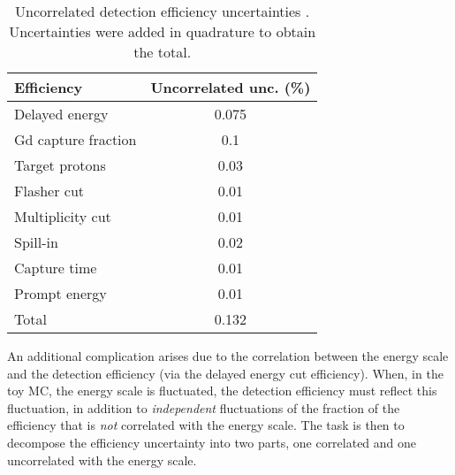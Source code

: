 \documentclass[../thesis.tex]{subfiles}
\begin{document}
\begin{table}[ht]
  \begin{tabular}{lc}
    \toprule
    Efficiency & Uncorrelated unc. (\%) \\
    \midrule
    Delayed energy & 0.075 \\
    Gd capture fraction & 0.1 \\
    Target protons & 0.03 \\
    Flasher cut & 0.01 \\
    Multiplicity cut & 0.01 \\
    Spill-in & 0.02 \\
    Capture time & 0.01 \\
    Prompt energy & 0.01 \\
    \midrule
    Total & 0.132 \\
    \bottomrule
  \end{tabular}
  \caption{Uncorrelated detection efficiency uncertainties \cite{loganDetEff}. Uncertainties were added in quadrature to obtain the total.}
  \label{tab:detEff}
\end{table}

An additional complication arises due to the correlation between the energy scale and the detection efficiency (via the delayed energy cut efficiency). When, in the toy MC, the energy scale is fluctuated, the detection efficiency must reflect this fluctuation, in addition to \emph{independent} fluctuations of the fraction of the efficiency that is \emph{not} correlated with the energy scale. The task is then to decompose the efficiency uncertainty into two parts, one correlated and one uncorrelated with the energy scale.
\end{document}
